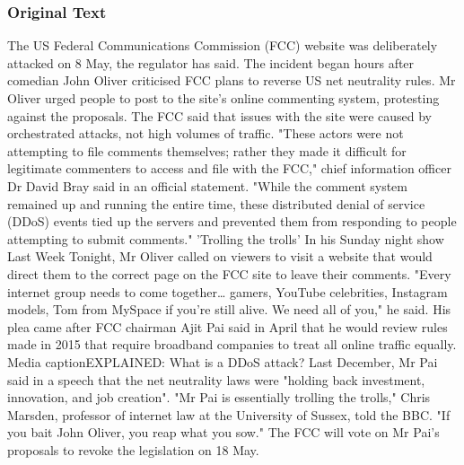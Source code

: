 \subsubsection{Original Text}
The US Federal Communications Commission (FCC) website was deliberately attacked on 8 May, the regulator has said.
The incident began hours after comedian John Oliver criticised FCC plans to reverse US net neutrality rules.
Mr Oliver urged people to post to the site's online commenting system, protesting against the proposals.
The FCC said that issues with the site were caused by orchestrated attacks, not high volumes of traffic.
"These actors were not attempting to file comments themselves; rather they made it difficult for legitimate commenters to access and file with the FCC," chief information officer Dr David Bray said in an official statement.
"While the comment system remained up and running the entire time, these distributed denial of service (DDoS) events tied up the servers and prevented them from responding to people attempting to submit comments."
'Trolling the trolls'
In his Sunday night show Last Week Tonight, Mr Oliver called on viewers to visit a website that would direct them to the correct page on the FCC site to leave their comments.
"Every internet group needs to come together… gamers, YouTube celebrities, Instagram models, Tom from MySpace if you're still alive. We need all of you," he said.
His plea came after FCC chairman Ajit Pai said in April that he would review rules made in 2015 that require broadband companies to treat all online traffic equally.
Media captionEXPLAINED: What is a DDoS attack?
Last December, Mr Pai said in a speech that the net neutrality laws were "holding back investment, innovation, and job creation".
"Mr Pai is essentially trolling the trolls," Chris Marsden, professor of internet law at the University of Sussex, told the BBC.
"If you bait John Oliver, you reap what you sow."
The FCC will vote on Mr Pai's proposals to revoke the legislation on 18 May.

